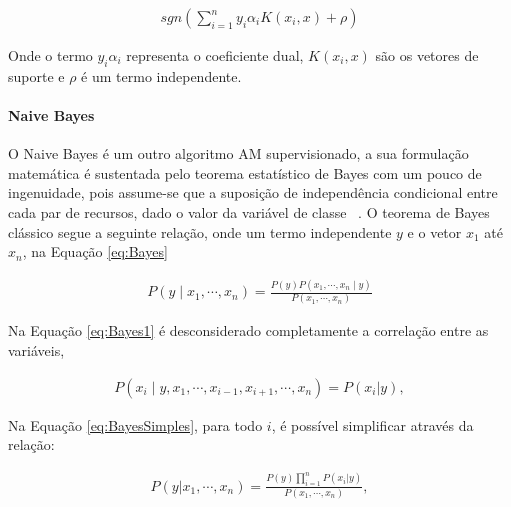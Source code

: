          \begin{equation}\label{eq:predSVM}
          \begin{aligned}
            sgn(\sum_{i=1}^{n}y_{i}\alpha_{i}K(x_{i},x)+\rho )
        \end{aligned}
        \end{equation}
        
        Onde o termo $y_{i}\alpha_{i}$ representa o coeficiente dual, $K(x_{i},x)$ são os vetores de suporte e $\rho$ é um termo independente.



        \paragraph{Naive Bayes}

        O Naive Bayes é um outro algoritmo \acrshort{AM} supervisionado, a sua formulação matemática é sustentada pelo teorema estatístico de
        Bayes com um pouco de ingenuidade, pois assume-se que a suposição de independência condicional entre cada par de recursos, dado o valor da
        variável de classe ~\cite{McCallum98acomparison}. O teorema de Bayes clássico segue a seguinte relação, onde um termo independente $y$ e o vetor $x_{1}$ até $x_{n}$, na Equação
        \ref{eq:Bayes}

        \begin{equation}\label{eq:Bayes}
          \begin{aligned}
            P\left ( y\mid x_{1},\cdots, x_{n} \right ) = \frac{P(y)P(x_{1},\cdots,x_{n}\mid y)}{P(x_{1},\cdots, x_{n})}
        \end{aligned}
        \end{equation}
        

        Na Equação \ref{eq:Bayes1} é desconsiderado completamente a correlação entre as variáveis, 


        \begin{equation}\label{eq:Bayes1}
          \begin{aligned}
            P\left ( x_{i}\mid y,x_{1}, \cdots,x_{i-1},x_{i+1},\cdots, x_{n} \right ) = P(x_{i}|y),
        \end{aligned}
        \end{equation}


        Na Equação \ref{eq:BayesSimples}, para todo $i$, é possível simplificar através da relação:


        \begin{equation}\label{eq:BayesSimples}
          \begin{aligned}
            P(y|x_{1},\cdots, x_{n}) = \frac{P(y)\prod_{i=1}^{n}P(x_{i}|y)}{P(x_{1},\cdots, x_{n})},
        \end{aligned}
        \end{equation}



